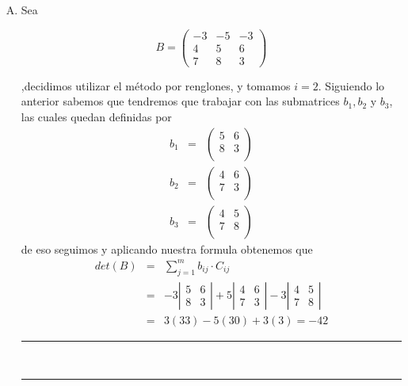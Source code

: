 \documentclass[12pt]{article}
\begin{document}
\begin{multicols}{2}
\begin{enumerate}[A.]
	\hrule\ \\\hrule
		
		\item Sea
		
			$$B = \left(\begin{array}{rrr}
				-3 & -5 & -3 \\
				4 & 5 & 6 \\
				7 & 8 & 3
				\end{array}\right) 
			$$
			
		,decidimos utilizar el m\'etodo por renglones, y tomamos $i=2$. Siguiendo lo anterior sabemos que tendremos que trabajar con las submatrices $b_1, b_2$ y $b_3$, las cuales quedan definidas por
		\begin{eqnarray*}
			b_1 &=&	\begin{pmatrix}
						5 & 6\\
						8 & 3\\
					\end{pmatrix} \\
			b_2 &=&	\begin{pmatrix}
						4 & 6\\
						7 & 3\\
					\end{pmatrix} \\
			b_3 &=&	\begin{pmatrix}
						4 & 5\\
						7 & 8\\
					\end{pmatrix} 
		\end{eqnarray*}
		de eso seguimos y aplicando nuestra formula obtenemos que
		\begin{eqnarray*}
			det(B) &=& \sum_{j=1}^m b_{ij} \cdot C_{ij} \\
				&=&	-3 \left|\begin{array}{rr}
							5 & 6 \\
							8 & 3
						\end{array}\right| 
					+5 \left|\begin{array}{rr}
							4 & 6 \\
							7 & 3
						\end{array}\right| 
					-3 \left|\begin{array}{rr}
							4 & 5 \\
							7 & 8
						\end{array}\right|   \\
				&=&	  3(33) -5(30) +3(3) = -42
		\end{eqnarray*}		

		\hrule\ \\\hrule
		
	\end{enumerate}
\end{multicols}
\end{document}
